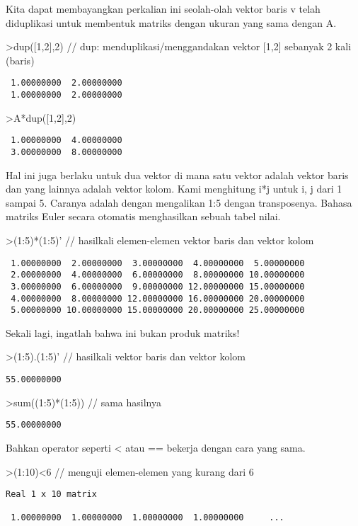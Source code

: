 \documentclass[
]{book}
\begin{document}
Kita dapat membayangkan perkalian ini seolah-olah vektor baris v telah diduplikasi untuk membentuk matriks dengan ukuran yang sama dengan A.

\textgreater dup({[}1,2{]},2) // dup: menduplikasi/menggandakan vektor {[}1,2{]} sebanyak 2 kali (baris)

\begin{verbatim}
 1.00000000  2.00000000 
 1.00000000  2.00000000 
\end{verbatim}

\textgreater A*dup({[}1,2{]},2)

\begin{verbatim}
 1.00000000  4.00000000 
 3.00000000  8.00000000 
\end{verbatim}

Hal ini juga berlaku untuk dua vektor di mana satu vektor adalah vektor baris dan yang lainnya adalah vektor kolom. Kami menghitung i*j untuk i, j dari 1 sampai 5. Caranya adalah dengan mengalikan 1:5 dengan transposenya. Bahasa matriks Euler secara otomatis menghasilkan sebuah tabel nilai.

\textgreater(1:5)*(1:5)' // hasilkali elemen-elemen vektor baris dan vektor kolom

\begin{verbatim}
 1.00000000  2.00000000  3.00000000  4.00000000  5.00000000 
 2.00000000  4.00000000  6.00000000  8.00000000 10.00000000 
 3.00000000  6.00000000  9.00000000 12.00000000 15.00000000 
 4.00000000  8.00000000 12.00000000 16.00000000 20.00000000 
 5.00000000 10.00000000 15.00000000 20.00000000 25.00000000 
\end{verbatim}

Sekali lagi, ingatlah bahwa ini bukan produk matriks!

\textgreater(1:5).(1:5)' // hasilkali vektor baris dan vektor kolom

\begin{verbatim}
55.00000000 
\end{verbatim}

\textgreater sum((1:5)*(1:5)) // sama hasilnya

\begin{verbatim}
55.00000000 
\end{verbatim}

Bahkan operator seperti \textless{} atau == bekerja dengan cara yang sama.

\textgreater(1:10)\textless6 // menguji elemen-elemen yang kurang dari 6

\begin{verbatim}
Real 1 x 10 matrix

 1.00000000  1.00000000  1.00000000  1.00000000     ...
\end{verbatim}
\end{document}
